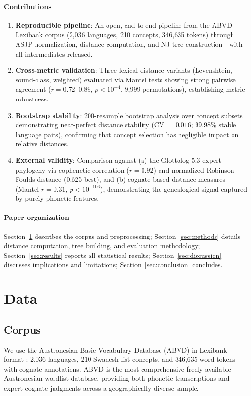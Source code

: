 \documentclass[manuscript]{clv2025}
\begin{document}
\paragraph{Contributions}
\begin{enumerate}
  \item \textbf{Reproducible pipeline}: An open, end-to-end pipeline from the ABVD Lexibank corpus (2{,}036 languages, 210 concepts, 346{,}635 tokens) through ASJP normalization, distance computation, and NJ tree construction---with all intermediates released.
  \item \textbf{Cross-metric validation}: Three lexical distance variants (Levenshtein, sound-class, weighted) evaluated via Mantel tests showing strong pairwise agreement ($r = 0.72$--$0.89$, $p < 10^{-4}$, 9{,}999 permutations), establishing metric robustness.
  \item \textbf{Bootstrap stability}: 200-resample bootstrap analysis over concept subsets demonstrating near-perfect distance stability (CV $= 0.016$; 99.98\% stable language pairs), confirming that concept selection has negligible impact on relative distances.
  \item \textbf{External validity}: Comparison against (a) the Glottolog 5.3 expert phylogeny via cophenetic correlation ($r = 0.92$) and normalized Robinson--Foulds distance (0.625 best), and (b) cognate-based distance measures (Mantel $r = 0.31$, $p < 10^{-106}$), demonstrating the genealogical signal captured by purely phonetic features.
\end{enumerate}

\paragraph{Paper organization}
Section~\ref{sec:data} describes the corpus and preprocessing; Section~\ref{sec:methods} details distance computation, tree building, and evaluation methodology; Section~\ref{sec:results} reports all statistical results; Section~\ref{sec:discussion} discusses implications and limitations; Section~\ref{sec:conclusion} concludes.

\section{Data}
\label{sec:data}

\subsection{Corpus}
We use the Austronesian Basic Vocabulary Database (ABVD) in Lexibank format \cite{greenhill2008abvd,list2022lexibank}: 2{,}036 languages, 210 Swadesh-list concepts, and 346{,}635 word tokens with cognate annotations. ABVD is the most comprehensive freely available Austronesian wordlist database, providing both phonetic transcriptions and expert cognate judgments across a geographically diverse sample.
\end{document}
